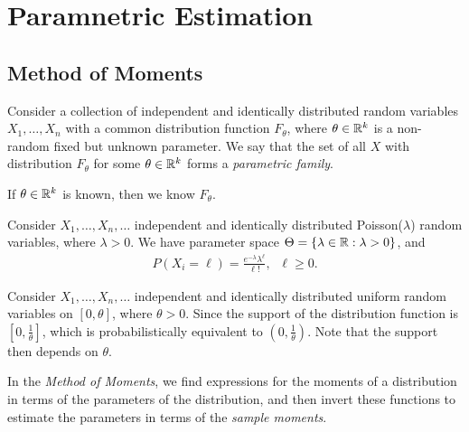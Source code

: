 \section{Paramnetric Estimation}

\subsection{Method of Moments}

\begin{defn}
    Consider a collection of independent and identically distributed random variables $X_1, \ldots, X_n$ with a common distribution function $F_{\theta}$, where $\theta \in \mathbb{R}^k$ is a non-random fixed but unknown parameter. We say that the set of all $X$ with distribution $F_{\theta}$ for some $\theta \in \mathbb{R}^k$ forms a \emph{parametric family}.
\end{defn}

\begin{rmk}
    If $\theta \in \mathbb{R}^{k}$ is known, then we know $F_{\theta}$.
\end{rmk}

\begin{exmp}
    Consider $X_1, \ldots, X_n, \ldots$ independent and identically distributed Poisson($\lambda$) random variables, where $\lambda > 0$. We have parameter space $\Theta = \{\lambda \in \mathbb{R}: \lambda > 0\}$, and
    \begin{align*}
        P(X_i = \ell) = \frac{e^{-\lambda}\lambda^{\ell}}{\ell!},\;\;\ell \geq 0.
    \end{align*}
\end{exmp}

\begin{exmp}
    Consider $X_1, \ldots, X_n, \ldots$ independent and identically distributed uniform random variables on $[0, \theta]$, where $\theta > 0$. Since the support of the distribution function is $[0, \frac{1}{\theta}]$, which is probabilistically equivalent to $(0, \frac{1}{\theta})$. Note that the support then depends on $\theta$.
\end{exmp}

\begin{defn}
    In the \emph{Method of Moments}, we find expressions for the moments of a distribution in terms of the parameters of the distribution, and then invert these functions to estimate the parameters in terms of the \emph{sample moments}.
\end{defn}

